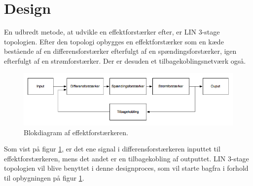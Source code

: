 \section{Design}
En udbredt metode, at udvikle en effektforstærker efter, er LIN 3-stage topologien. Efter den topologi opbygges en effektforstærker som en kæde bestående af en differensforstærker efterfulgt af en spændingsforstærker, igen efterfulgt af en strømforstærker. Der er desuden et tilbagekoblingsnetværk også. 

\begin{figure}[h]
\centering
\includegraphics[scale=0.5]{teknisk/effektforstaerker/blokdiagram-effektforstaerker.png}
\caption{Blokdiagram af effektforstærkeren.}
\label{fig:lin_effektforstaerker}
\end{figure}

Som vist på figur \ref{fig:lin_effektforstaerker}, er det ene signal i differensforstærkeren inputtet til effektforstærkeren, mens det andet er en tilbagekobling af outputtet. LIN 3-stage topologien vil blive benyttet i denne designproces, som vil starte bagfra i forhold til opbygningen på figur \ref{fig:lin_effektforstaerker}. 